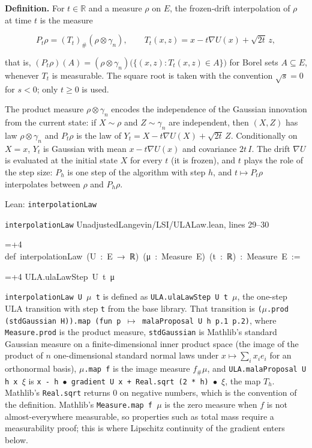 \documentclass[11pt,a4paper]{article}
\newlength{\leancharwidth}
\newenvironment{leancode}{\par\smallskip\begingroup\ttfamily\footnotesize\raggedright
  \settowidth{\leancharwidth}{M}\setlength{\parskip}{0pt}\setlength{\parindent}{0pt}
  \frenchspacing}{\par\endgroup\smallskip}
\newcommand{\leanline}[2]{\hangindent=\dimexpr#1\leancharwidth+4\leancharwidth\relax
  \hangafter=1\noindent\hspace*{#1\leancharwidth}#2\par}
\newcommand{\leansource}[1]{\par{\footnotesize\color{leanmuted}#1}\par}
\newcommand{\leanlabel}[1]{\par\smallskip\noindent{\small\bfseries #1}\par}
\begin{document}
\textbf{Definition.} For \(t\in\mathbb R\) and a measure \(\rho\) on \(E\), the frozen-drift interpolation of \(\rho\) at time \(t\) is the measure


\[P_t\rho=(T_t)_\#(\rho\otimes\gamma_n),\qquad T_t(x,z)=x-t\nabla U(x)+\sqrt{2t}\,z,\]


that is, \((P_t\rho)(A)=(\rho\otimes\gamma_n)\bigl(\{(x,z):T_t(x,z)\in A\}\bigr)\) for Borel sets \(A\subseteq E\), whenever \(T_t\) is measurable. The square root is taken with the convention \(\sqrt s=0\) for \(s<0\); only \(t\ge0\) is used.




The product measure \(\rho\otimes\gamma_n\) encodes the independence of the Gaussian innovation from the current state: if \(X\sim\rho\) and \(Z\sim\gamma_n\) are independent, then \((X,Z)\) has law \(\rho\otimes\gamma_n\) and \(P_t\rho\) is the law of \(Y_t=X-t\nabla U(X)+\sqrt{2t}\,Z\). Conditionally on \(X=x\), \(Y_t\) is Gaussian with mean \(x-t\nabla U(x)\) and covariance \(2t\,I\). The drift \(\nabla U\) is evaluated at the initial state \(X\) for every \(t\) (it is frozen), and \(t\) plays the role of the step size: \(P_h\) is one step of the algorithm with step \(h\), and \(t\mapsto P_t\rho\) interpolates between \(\rho\) and \(P_h\rho\).

\begin{leanbox}{Lean: \texttt{interpolationLaw}}
\leansource{\texttt{interpolationLaw} \quad UnadjustedLangevin/\allowbreak{}LSI/\allowbreak{}ULALaw.lean, lines 29–30}
\begin{leancode}
\leanline{0}{def\ interpolationLaw\ (U\ :\ E\ →\ ℝ)\ (μ\ :\ Measure\ E)\ (t\ :\ ℝ)\ :\ Measure\ E\ :=}
\leanline{2}{ULA.ulaLawStep\ U\ t\ μ}
\end{leancode}
\leanlabel{How the Lean proof follows the argument}
\texttt{interpolation\allowbreak{}Law U \ensuremath{\mu} t} is defined as \texttt{ULA.\allowbreak{}ula\allowbreak{}Law\allowbreak{}Step U t \ensuremath{\mu}}, the one-step ULA transition with step \texttt{t} from the base library. That transition is \texttt{(\ensuremath{\mu}.\allowbreak{}prod (std\allowbreak{}Gaussian H)).\allowbreak{}map (fun p \ensuremath{\mapsto} mala\allowbreak{}Proposal U h p.\allowbreak{}1 p.\allowbreak{}2)}, where \texttt{Measure.\allowbreak{}prod} is the product measure, \texttt{std\allowbreak{}Gaussian} is Mathlib's standard Gaussian measure on a finite-dimensional inner product space (the image of the product of \(n\) one-dimensional standard normal laws under \(x\mapsto\sum_ix_ie_i\) for an orthonormal basis), \texttt{\ensuremath{\mu}.\allowbreak{}map f} is the image measure \(f_\#\mu\), and \texttt{ULA.\allowbreak{}mala\allowbreak{}Proposal U h x \ensuremath{\xi}} is \texttt{x -\allowbreak{} h \ensuremath{\bullet} gradient U x + Real.\allowbreak{}sqrt (2 * h) \ensuremath{\bullet} \ensuremath{\xi}}, the map \(T_h\). Mathlib's \texttt{Real.\allowbreak{}sqrt} returns \(0\) on negative numbers, which is the convention of the definition. Mathlib's \texttt{Measure.\allowbreak{}map f \ensuremath{\mu}} is the zero measure when \(f\) is not almost-everywhere measurable, so properties such as total mass require a measurability proof; this is where Lipschitz continuity of the gradient enters below.
\end{leanbox}
\end{document}
